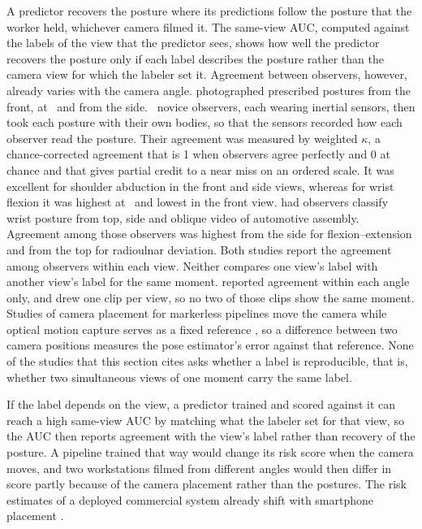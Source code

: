 \documentclass[review,3p,authoryear]{elsarticle}
\begin{document}
A predictor recovers the posture where its predictions follow the posture that the worker
held, whichever camera filmed it. The same-view AUC, computed against the labels of the
view that the predictor sees, shows how well the predictor recovers the posture only if
each label describes the posture rather than the camera view for which the labeler set
it. Agreement between observers, however, already
varies with the camera angle. \citet{lee2020camera} photographed prescribed postures from
the front, at \leeAngleOblique\textdegree\ and from the side. \leeNObserversCap\ novice
observers, each wearing inertial sensors, then took each posture with their own bodies, so
that the sensors recorded how each observer read the posture. Their agreement was measured by
weighted $\kappa$, a chance-corrected agreement that is 1 when observers agree perfectly
and 0 at chance and that gives partial credit to a near miss on an ordered scale. It was
excellent for shoulder abduction in the front and side views, whereas
for wrist flexion it was highest at \leeAngleOblique\textdegree\ and lowest in the front
view. \citet{mckinnon2020wrist} had observers classify wrist posture from top, side and
oblique video of automotive assembly. Agreement among those observers was highest from the
side for flexion--extension and from the top for radioulnar deviation. Both studies report
the agreement among observers within each view. Neither compares one view's label with another
view's label for the same moment. \citet{lee2020camera} reported
agreement within each angle only, and \citet{mckinnon2020wrist} drew one clip per view, so no two of those clips show the same moment. Studies of camera placement for markerless
pipelines move the camera while optical motion capture serves as a fixed reference
\citep{baldinger2025openpose,aghazadeh2026view}, so a difference between two camera
positions measures the pose estimator's error against that reference. None of the studies that this section cites asks whether a label is reproducible, that is, whether two simultaneous views of
one moment carry the same label.

If the label depends on the view, a predictor trained and scored against it can reach a
high same-view AUC by matching what the labeler set for that view, so the AUC then reports
agreement with the view's label rather than recovery of the posture. A pipeline trained that
way would change its risk score when the camera moves, and two workstations filmed from
different angles would then differ in score partly because of the camera placement rather
than the postures. The risk estimates of a deployed commercial system already shift with
smartphone placement \citep{zahabi2026commercial}.
\end{document}
